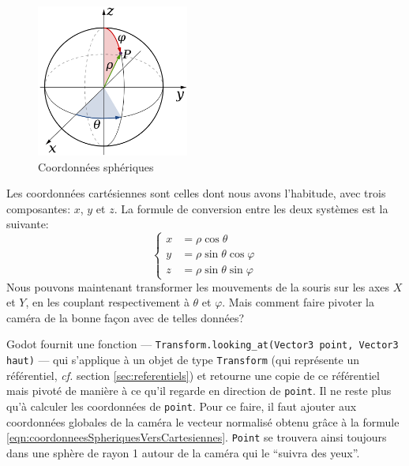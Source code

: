 \begin{figure}[th!]
	\center
	\includegraphics[width=5cm]{images/Technique/coordonneesSpheriques.png}
	\caption{\label{fig:coordonneesSpheriques}Coordonnées sphériques{\cite{Adiagramofsphericalcoordinatesdefiningapointbycolatitudelongitudeandradius_Wikipedia}}}
\end{figure}

Les coordonnées cartésiennes sont celles dont nous avons l'habitude, avec trois composantes: $x$, $y$ et $z$. La formule de conversion entre les deux systèmes est la suivante:
\begin{equation}
	\left\{
	\begin{array}{ll}
		x &= \rho \cos \theta\\
		y &= \rho \sin \theta \cos \varphi\\
		z &= \rho \sin \theta \sin \varphi
	\end{array}	
	\right.
	\label{eqn:coordonneesSpheriquesVersCartesiennes}
\end{equation}
Nous pouvons maintenant transformer les mouvements de la souris sur les axes $X$ et $Y$, en les couplant respectivement à $\theta$ et $\varphi$. Mais comment faire pivoter la caméra de la bonne façon avec de telles données?

Godot fournit une fonction --- \lstinline{Transform.looking_at(Vector3 point, Vector3 haut)} --- qui s'applique à un objet de type \lstinline{Transform} (qui représente un référentiel, \textit{cf.} section \ref{sec:referentiels}) et retourne une copie de ce référentiel mais pivoté de manière à ce qu'il regarde en direction de \lstinline{point}. Il ne reste plus qu'à calculer les coordonnées de \lstinline{point}. Pour ce faire, il faut ajouter aux coordonnées globales de la caméra le vecteur normalisé obtenu grâce à la formule \ref{eqn:coordonneesSpheriquesVersCartesiennes}. \lstinline{Point} se trouvera ainsi toujours dans une sphère de rayon 1 autour de la caméra qui le \enquote{suivra des yeux}.


